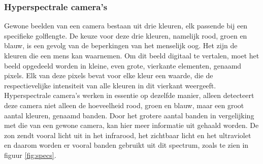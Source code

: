 \documentclass[12pt]{report}
\begin{document}
\subsubsection{Hyperspectrale camera's}
Gewone beelden van een camera bestaan uit drie kleuren, elk passende bij een specifieke golflengte. De keuze voor deze drie kleuren, namelijk rood, groen en blauw, is een gevolg van de beperkingen van het menselijk oog. Het zijn de kleuren die een mens kan waarnemen. Om dit beeld digitaal te vertalen, moet het beeld opgedeeld worden in kleine, even grote, vierkante elementen, genaamd pixels. Elk van deze pixels bevat voor elke kleur een waarde, die de respectievelijke intensiteit van alle kleuren in dit vierkant weergeeft. Hyperspectrale camera's werken in essentie op dezelfde manier, alleen detecteert deze camera niet alleen de hoeveelheid rood, groen en blauw, maar een groot aantal kleuren, genaamd banden. Door het grotere aantal banden in vergelijking met die van een gewone camera, kan hier meer informatie uit gehaald worden. De zon zendt vooral licht uit in het infrarood, het zichtbaar licht en het ultraviolet en daarom worden er vooral banden gebruikt uit dit spectrum, zoals te zien in figuur \ref{fig:specs}.
\end{document}
